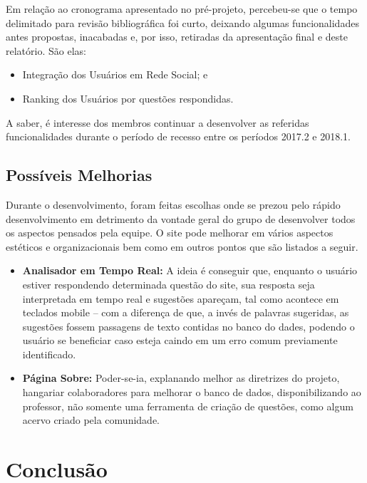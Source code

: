 \documentclass[11pt, a4paper]{article}
\begin{document}
			Em relação ao cronograma apresentado no pré-projeto, percebeu-se que o tempo delimitado para revisão bibliográfica foi curto, deixando algumas funcionalidades antes propostas, inacabadas e, por isso, retiradas da apresentação final e deste relatório. São elas:

			\begin{itemize}
				\item Integração dos Usuários em Rede Social; e
				\item Ranking dos Usuários por questões respondidas.
			\end{itemize}

			A saber, é interesse dos membros continuar a desenvolver as referidas funcionalidades durante o período de recesso entre os períodos 2017.2 e 2018.1.

		\subsection{Possíveis Melhorias}

			Durante o desenvolvimento, foram feitas escolhas onde se prezou pelo rápido desenvolvimento em detrimento da vontade geral do grupo de desenvolver todos os aspectos pensados pela equipe. O site pode melhorar em vários aspectos estéticos e organizacionais bem como em outros pontos que são listados a seguir.

			\begin{itemize}
				\item \textbf{Analisador em Tempo Real:} A ideia é conseguir que, enquanto o usuário estiver respondendo determinada questão do site, sua resposta seja interpretada em tempo real e sugestões apareçam, tal como acontece em teclados mobile -- com a diferença de que, a invés de palavras sugeridas, as sugestões fossem passagens de texto contidas no banco do dades, podendo o usuário se beneficiar caso esteja caindo em um erro comum previamente identificado.

				\item \textbf{Página Sobre:} Poder-se-ia, explanando melhor as diretrizes do projeto, hangariar colaboradores para melhorar o banco de dados, disponibilizando ao professor, não somente uma ferramenta de criação de questões, como algum acervo criado pela comunidade.
			\end{itemize}

	\section{Conclusão}
\end{document}

